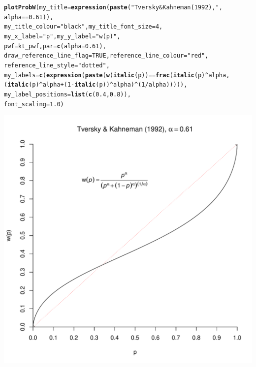 \documentclass{article}\usepackage[]{graphicx}\usepackage[]{color}
\makeatletter
\def\maxwidth{ %
  \ifdim\Gin@nat@width>\linewidth
    \linewidth
  \else
    \Gin@nat@width
  \fi
}
\newcommand{\hlnum}[1]{\textcolor[rgb]{0.686,0.059,0.569}{#1}}%
\newcommand{\hlstr}[1]{\textcolor[rgb]{0.192,0.494,0.8}{#1}}%
\newcommand{\hlopt}[1]{\textcolor[rgb]{0,0,0}{#1}}%
\newcommand{\hlstd}[1]{\textcolor[rgb]{0.345,0.345,0.345}{#1}}%
\newcommand{\hlkwc}[1]{\textcolor[rgb]{0.333,0.667,0.333}{#1}}%
\newcommand{\hlkwd}[1]{\textcolor[rgb]{0.737,0.353,0.396}{\textbf{#1}}}%
\newenvironment{kframe}{%
 \def\at@end@of@kframe{}%
 \ifinner\ifhmode%
  \def\at@end@of@kframe{\end{minipage}}%
  \begin{minipage}{\columnwidth}%
 \fi\fi%
 \def\FrameCommand##1{\hskip\@totalleftmargin \hskip-\fboxsep
 \colorbox{shadecolor}{##1}\hskip-\fboxsep
     \hskip-\linewidth \hskip-\@totalleftmargin \hskip\columnwidth}%
 \MakeFramed {\advance\hsize-\width
   \@totalleftmargin\z@ \linewidth\hsize
   \@setminipage}}%
 {\par\unskip\endMakeFramed%
 \at@end@of@kframe}
\newenvironment{knitrout}{}{} %
\makeatother
\begin{document}
\begin{knitrout}
\color{fgcolor}\begin{kframe}
\begin{alltt}
\hlkwd{plotProbW}\hlstd{(}\hlkwc{my_title}\hlstd{=}\hlkwd{expression}\hlstd{(}\hlkwd{paste}\hlstd{(}\hlstr{"Tversky & Kahneman (1992), "}\hlstd{,}
        \hlstd{alpha}\hlopt{==}\hlnum{0.61}\hlstd{)),}
        \hlkwc{my_title_colour}\hlstd{=}\hlstr{"black"}\hlstd{,} \hlkwc{my_title_font_size}\hlstd{=}\hlnum{4}\hlstd{,}
        \hlkwc{my_x_label} \hlstd{=} \hlstr{"p"}\hlstd{,} \hlkwc{my_y_label} \hlstd{=} \hlstr{"w(p)"}\hlstd{,}
        \hlkwc{pwf}\hlstd{=kt_pwf,} \hlkwc{par}\hlstd{=}\hlkwd{c}\hlstd{(}\hlkwc{alpha}\hlstd{=}\hlnum{0.61}\hlstd{),}
        \hlkwc{draw_reference_line_flag}\hlstd{=}\hlnum{TRUE}\hlstd{,} \hlkwc{reference_line_colour}\hlstd{=}\hlstr{"red"}\hlstd{,}
        \hlkwc{reference_line_style}\hlstd{=}\hlstr{"dotted"}\hlstd{,}
        \hlkwc{my_labels}\hlstd{=}\hlkwd{c}\hlstd{(}\hlkwd{expression}\hlstd{(}\hlkwd{paste}\hlstd{(}\hlkwd{w}\hlstd{(}\hlkwd{italic}\hlstd{(p))} \hlopt{==} \hlkwd{frac}\hlstd{(}\hlkwd{italic}\hlstd{(p)}\hlopt{^}\hlstd{alpha,}
                \hlstd{(}\hlkwd{italic}\hlstd{(p)}\hlopt{^}\hlstd{alpha} \hlopt{+} \hlstd{(}\hlnum{1}\hlopt{-}\hlkwd{italic}\hlstd{(p))}\hlopt{^}\hlstd{alpha)}\hlopt{^}\hlstd{(}\hlnum{1}\hlopt{/}\hlstd{alpha))))),}
        \hlkwc{my_label_positions}\hlstd{=}\hlkwd{list}\hlstd{(}\hlkwd{c}\hlstd{(}\hlnum{0.4}\hlstd{,}\hlnum{0.8}\hlstd{)),}
        \hlkwc{font_scaling}\hlstd{=}\hlnum{1.0}\hlstd{)}
\end{alltt}
\end{kframe}

{\centering \includegraphics[width=\maxwidth]{figure/unnamed-chunk-20} 

}



\end{knitrout}
\end{document}
